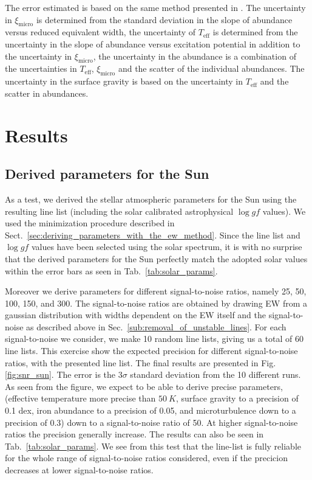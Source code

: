 \documentclass{aa}
\begin{document}
The error estimated is based on the same method presented in \citet{Gonzalez1998}.
The uncertainty in $\xi_\mathrm{micro}$ is determined from the standard deviation
in the slope of abundance versus reduced equivalent width, the uncertainty of
$T_\mathrm{eff}$ is determined from the uncertainty in the slope of abundance
versus excitation potential in addition to the uncertainty in $\xi_\mathrm{micro}$,
the uncertainty in the  abundance is a combination of the uncertainties
in $T_\mathrm{eff}$, $\xi_\mathrm{micro}$ and the scatter of the individual
 abundances. The uncertainty in the surface gravity is based on
the uncertainty in $T_\mathrm{eff}$ and the scatter in  abundances.


\section{Results}
\label{sec:results}

\subsection{Derived parameters for the Sun}
\label{sec:derived_parameters_of_the_sun}

As a test, we derived the stellar atmospheric parameters for the Sun using
the resulting line list (including the solar calibrated astrophysical
$\log \mathit{gf}$ values). We used the minimization procedure described
in Sect.~\ref{sec:deriving_parameters_with_the_ew_method}. Since the
line list and $\log\mathit{gf}$ values have been selected using the
solar spectrum, it is with no surprise that the derived parameters for
the Sun perfectly match the adopted solar values within the error bars
as seen in Tab.~\ref{tab:solar_params}.

Moreover we derive parameters for different signal-to-noise ratios,
namely 25, 50, 100, 150, and 300. The signal-to-noise ratios
are obtained by drawing EW from a gaussian distribution with widths
dependent on the EW itself and the signal-to-noise as described above
in Sec.~\ref{sub:removal_of_unstable_lines}. For each signal-to-noise we
consider, we make 10 random line lists, giving us a total of 60 line lists. This
exercise show the expected precision for different signal-to-noise ratios,
with the presented line list. The final results are presented in
Fig.\ref{fig:snr_sun}. The error is the $3 \sigma$ standard deviation
from the 10 different runs. As seen from the figure, we expect to
be able to derive precise parameters, (effective temperature more
precise than $\SI{50}{K}$, surface gravity to a precision of 0.1 dex,
iron abundance to a precision of 0.05, and microturbulence down to a
precision of 0.3) down to a signal-to-noise ratio of 50. At higher
signal-to-noise ratios the precision generally increase. The results can
also be seen in Tab.~\ref{tab:solar_params}. We see from this test that
the line-list is fully reliable for the whole range of signal-to-noise
ratios considered, even if the precicion decreases at lower signal-to-noise
ratios.
\end{document}
